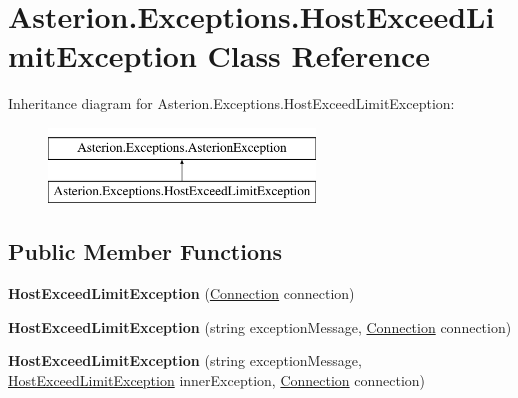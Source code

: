 \hypertarget{classAsterion_1_1Exceptions_1_1HostExceedLimitException}{\section{Asterion.\-Exceptions.\-Host\-Exceed\-Limit\-Exception Class Reference}
\label{classAsterion_1_1Exceptions_1_1HostExceedLimitException}
}
Inheritance diagram for Asterion.\-Exceptions.\-Host\-Exceed\-Limit\-Exception\-:\begin{figure}[H]
\begin{center}
\leavevmode
\includegraphics[height=2.000000cm]{classAsterion_1_1Exceptions_1_1HostExceedLimitException}
\end{center}
\end{figure}
\subsection*{Public Member Functions}
\begin{DoxyCompactItemize}
\item 
\hypertarget{classAsterion_1_1Exceptions_1_1HostExceedLimitException_aae8d35125e0ba697eb7ec919bd37b653}{{\bfseries Host\-Exceed\-Limit\-Exception} (\hyperlink{classAsterion_1_1Connection}{Connection} connection)}\label{classAsterion_1_1Exceptions_1_1HostExceedLimitException_aae8d35125e0ba697eb7ec919bd37b653}

\item 
\hypertarget{classAsterion_1_1Exceptions_1_1HostExceedLimitException_a699e0316ebe3641c31bba1e3f06938f5}{{\bfseries Host\-Exceed\-Limit\-Exception} (string exception\-Message, \hyperlink{classAsterion_1_1Connection}{Connection} connection)}\label{classAsterion_1_1Exceptions_1_1HostExceedLimitException_a699e0316ebe3641c31bba1e3f06938f5}

\item 
\hypertarget{classAsterion_1_1Exceptions_1_1HostExceedLimitException_a0f4c7c1eb24ea2c3e1639f8e1df64e68}{{\bfseries Host\-Exceed\-Limit\-Exception} (string exception\-Message, \hyperlink{classAsterion_1_1Exceptions_1_1HostExceedLimitException}{Host\-Exceed\-Limit\-Exception} inner\-Exception, \hyperlink{classAsterion_1_1Connection}{Connection} connection)}\label{classAsterion_1_1Exceptions_1_1HostExceedLimitException_a0f4c7c1eb24ea2c3e1639f8e1df64e68}

\end{DoxyCompactItemize}
